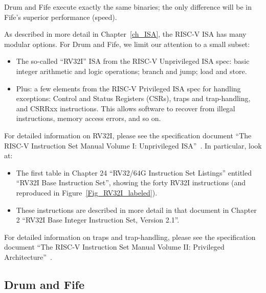 Drum and Fife execute exactly the same binaries; the only difference
will be in Fife's superior performance (speed).

As described in more detail in Chapter~\ref{ch_ISA}, the RISC-V ISA
has many modular options.  For Drum and Fife, we limit our attention
to a small subset:

\begin{itemize}
		  
 \item The so-called ``RV32I'' ISA from the RISC-V Unprivileged ISA
       spec: basic integer arithmetic and logic operations; branch and
       jump; load and store.

 \item Plus: a few elements from the RISC-V Privileged ISA spec for
       handling exceptions: Control and Status Registers (CSRs), traps
       and trap-handling, and CSRRxx instructions.  This allows
       software to recover from illegal instructions, memory access
       errors, and so on.

\end{itemize}

For detailed information on RV32I, please see the specification
document ``The RISC-V Instruction Set Manual Volume I: Unprivileged
ISA''~\cite{RISCV_Unpriv_2019_12_13}.  In particular, look at:

\begin{itemize}

 \item The first table in Chapter 24 ``RV32/64G Instruction Set
       Listings'' entitled ``RV32I Base Instruction Set'', showing the
       forty RV32I instructions (and reproduced in
       Figure~\ref{Fig_RV32I_labeled}).

 \item These instructions are described in more detail in that
       document in Chapter 2 ``RV32I Base Integer Instruction Set,
       Version 2.1''.

\end{itemize}

For detailed information on traps and trap-handling, please see the
specification document ``The RISC-V Instruction Set Manual Volume II:
Privileged Architecture''~\cite{RISCV_Priv_2021_12_03}.


\subsection{Drum and Fife}

